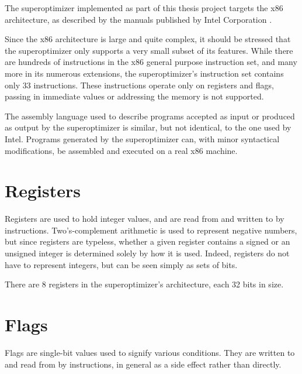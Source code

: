 \documentclass[a4paper,11pt]{kth-mag}
\begin{document}
The superoptimizer implemented as part of this thesis project targets the x86 architecture, as described by the manuals published by Intel Corporation \cite{intel_1,intel_2a,intel_2b}.

Since the x86 architecture is large and quite complex, it should be stressed that the superoptimizer only supports a very small subset of its features.
While there are hundreds of instructions in the x86 general purpose instruction set, and many more in its numerous extensions, the superoptimizer's instruction set contains only 33 instructions.
These instructions operate only on registers and flags, passing in immediate values or addressing the memory is not supported.


The assembly language used to describe programs accepted as input or produced as output by the superoptimizer is similar, but not identical, to the one used by Intel.
Programs generated by the superoptimizer can, with minor syntactical modifications, be assembled and executed on a real x86 machine.


\section{Registers}

Registers are used to hold integer values, and are read from and written to by instructions.
Two's-complement arithmetic is used to represent negative numbers, but since registers are typeless, whether a given register contains a signed or an unsigned integer is determined solely by how it is used.
Indeed, registers do not have to represent integers, but can be seen simply as sets of bits.

There are 8 registers in the superoptimizer's architecture, each 32 bits in size.

\section{Flags}
\label{s:flags}

Flags are single-bit values used to signify various conditions.
They are written to and read from by instructions, in general as a side effect rather than directly.
\end{document}
